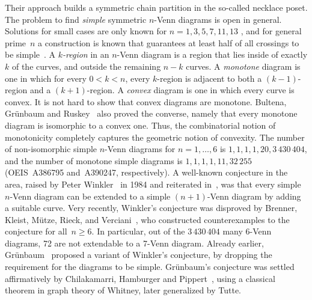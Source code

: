 \documentclass[11pt]{article}
\newcommand{\defi}[1]{\textcolor{defblue}{\emph{#1}}}
\begin{document}
Their approach builds a symmetric chain partition in the so-called necklace poset.
The problem to find \emph{simple} symmetric $n$-Venn diagrams is open in general.
Solutions for small cases are only known for $n=1,3,5,7,11,13$ \cite{MR3231031}, and for general prime~$n$ a construction is known that guarantees at least half of all crossings to be simple~\cite{MR2114190}.
%
A \defi{$k$-region} in an $n$-Venn diagram is a region that lies inside of exactly $k$ of the curves, and outside the remaining $n-k$ curves.
A \defi{monotone} diagram is one in which for every $0<k<n$, every $k$-region is adjacent to both a $(k-1)$-region and a $(k+1)$-region.
A \defi{convex} diagram is one in which every curve is convex.
It is not hard to show that convex diagrams are monotone.
Bultena, Gr\"unbaum and Ruskey~\cite{DBLP:conf/cccg/BultenaGR99} also proved the converse, namely that every monotone diagram is isomorphic to a convex one.
Thus, the combinatorial notion of monotonicity completely captures the geometric notion of convexity.
%
The number of non-isomorphic simple $n$-Venn diagrams for $n=1,\ldots,6$ is $1,1,1,1,20,3\,430\,404$, and the number of monotone simple diagrams is $1,1,1,1,11,32\,255$~\cite{MR1486434,MR1789063,venn_preprint} (OEIS~A386795 and~A390247, respectively).
%
A well-known conjecture in the area, raised by Peter Winkler~\cite{MR777726} in 1984 and reiterated in~\cite{DBLP:journals/cacm/Winkler12}, was that every simple $n$-Venn diagram can be extended to a simple $(n+1)$-Venn diagram by adding a suitable curve.
Very recently, Winkler's conjecture was disproved by Brenner, Kleist, Mütze, Rieck, and Verciani~\cite{venn_preprint}, who constructed counterexamples to the conjecture for all~$n \geq 6$.
In particular, out of the $3\,430\,404$ many 6-Venn diagrams, 72 are not extendable to a 7-Venn diagram.
Already earlier, Gr\"unbaum~\cite{MR1208440} proposed a variant of Winkler's conjecture, by dropping the requirement for the diagrams to be simple.
Gr\"unbaum's conjecture was settled affirmatively by Chilakamarri, Hamburger and Pippert~\cite{MR1400982}, using a classical theorem in graph theory of Whitney, later generalized by Tutte.
%
\end{document}
